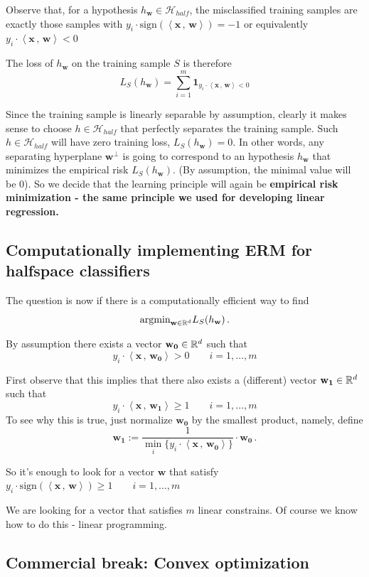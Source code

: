 \documentclass[11pt]{article}
\newcommand{\Hc}{\mathcal{H}}
\newcommand{\innerr}[2]{{\left\langle #1\,,\,#2 \right\rangle}}
\newcommand{\VV}[1]{\mathbf{#1}}
\begin{document}
Observe that, for a hypothesis $  h_\VV{w} \in \Hc_{half}$,  the misclassified
training 
samples are exactly those samples with 
$y_i \cdot \text{sign}\left( \innerr{\VV{x}}{\VV{w}}\right) = -1$ or equivalently 
$y_i \cdot \innerr{\VV{x}}{\VV{w}}  <0$

The loss of $ h_\VV{w}$ on the training sample $S$ is therefore
\[
  L_S( h_\VV{w}) = \sum_{i=1}^m \mathbf{1}_{y_i \cdot 
  \innerr{\VV{x}}{\VV{w}} <0}
\]

Since the training
sample is linearly separable by assumption, clearly it makes sense to choose $h\in\Hc_{half}$ 
that perfectly separates the training sample. Such $h\in\Hc_{half}$ will have
zero training loss, $ L_S( h_\VV{w}) =0$.
In other words, any separating hyperplane $\VV{w}^\perp$ is going
to correspond to an hypothesis $h_\VV{w}$ that minimizes the empirical risk 
$  L_S( h_\VV{w})$. (By assumption, the minimal value will be $0$).
So we decide that the learning principle will again be {\bf
empirical risk minimization -  the same principle we used for developing
linear regression.} 

\subsection{Computationally implementing ERM for halfspace classifiers}

The question is now if there is a computationally efficient way to find
\[  \text{argmin}_{\VV{w}\in\reals^d} L_S(h_\VV{w})\,.\]

By assumption there exists a vector $\VV{w_0}\in\reals^d$ such that
\[
y_i \cdot \innerr{\VV{x}}{\VV{w_0}}  > 0\qquad 
i=1,\ldots,m
\]

First observe that this implies that there also exists a (different) vector
 $\VV{w_1}\in\reals^d$ such that
 \[
y_i \cdot \innerr{\VV{x}}{\VV{w_1}}  \geq 1 \qquad 
i=1,\ldots,m
\]
To see why this is true, just normalize $\VV{w_0}$ by the smallest product,
namely, define 
\[
  \VV{w_1} := \frac{1}{ \min_i \{y_i \cdot 
  \innerr{\VV{x}}{\VV{w_0}} \}  }\cdot \VV{w_0}\,.
\]

So it's enough to look for a vector $\VV{w}$ that satisfy
 $
y_i \cdot \text{sign}\left( \innerr{\VV{x}}{\VV{w}} \right) \geq 1 \qquad 
i=1,\ldots,m
$

We are looking for a vector that  satisfies $m$ linear constrains. Of course we
know how to do this - linear programming.

\subsection{Commercial break: Convex optimization}
\end{document}
